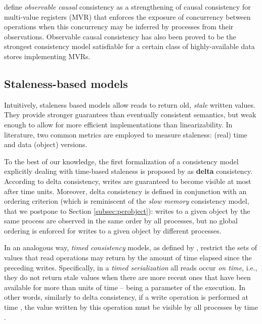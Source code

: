\documentclass[letter, 11pt]{article}
\newcommand{\citeN}{\citet}
\begin{document}
\citeN{Attiya.ea:15} define \emph{observable causal} consistency as a strengthening of causal consistency
for multi-value registers (MVR)
that enforces the exposure of concurrency between operations when this concurrency may be inferred by processes from their observations.
Observable causal consistency has also been proved to be the strongest consistency model satisfiable 
for a certain class of highly-available data stores implementing MVRs.





\subsection{Staleness-based models}
\label{subsec:timed}
Intuitively, staleness based models allow reads to return old, \emph{stale} written values. They provide stronger guarantees than eventually consistent semantics, but weak enough to allow for more efficient implementations than linearizability. In literature, two common metrics are employed to measure staleness: (real) time and data (object) versions.

To the best of our knowledge, the first formalization of a consistency model explicitly dealing with time-based staleness is proposed by \citeN{Singla.ea:97}
as \textbf{delta} consistency.
According to delta consistency, writes are guaranteed to become visible at most after  time units.
Moreover, delta consistency is defined in conjunction with an ordering criterion (which is reminiscent of the \emph{slow memory} consistency model, that we postpone to Section \ref{subsec:perobject}):
writes to a given object by the same process are observed in the same order by all processes, 
but no global ordering is enforced for writes to a given object by different processes.

In an analogous way, \emph{timed consistency} models, as defined by \citeN{Torres-Rojas.Ahamad.ea:99}, 
restrict the sets of values that read operations may return 
by the amount of time elapsed since the preceding writes.
Specifically, in a \emph{timed serialization} 
all reads occur \emph{on time}, i.e., they do not return stale values when 
there are more recent ones that have been available 
for more than  units of time --  being a parameter of the execution.
In other words, similarly to delta consistency, if a write operation is performed at time ,
the value written by this operation must be visible by all processes by time . 
\end{document}
